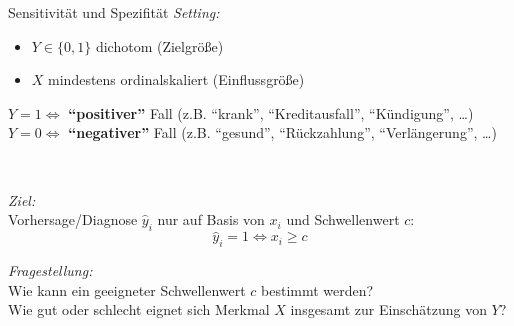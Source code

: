 \documentclass[
  10pt,
  ignorenonframetext,
]{beamer}
\providecommand{\tightlist}{%
  \setlength{\itemsep}{0pt}\setlength{\parskip}{0pt}}
\begin{document}
\begin{frame}{Sensitivität und Spezifität}
\label{sensitivituxe4t-und-spezifituxe4t}
\emph{Setting:}

\begin{itemize}
\tightlist
\item
  \(Y \in \{0, 1\}\) dichotom (Zielgröße)
\item
  \(X\) mindestens ordinalskaliert (Einflussgröße)
\end{itemize}

\(Y=1 \iff\) \textbf{``positiver''} Fall (z.B. ``krank'',
``Kreditausfall'', ``Kündigung'', \ldots)\\
\(Y=0 \iff\) \textbf{``negativer''} Fall (z.B. ``gesund'',
``Rückzahlung'', ``Verlängerung'', \ldots)\\
\strut ~

\emph{Ziel:}\\
Vorhersage/Diagnose \(\hat{y}_{i}\) nur auf Basis von \(x_i\) und
Schwellenwert \(c\): \[\hat{y}_{i} = 1\iff x_{i}\geq c\]

\emph{Fragestellung:}\\
Wie kann ein geeigneter Schwellenwert \(c\) bestimmt werden?\\
Wie gut oder schlecht eignet sich Merkmal \(X\) insgesamt zur
Einschätzung von \(Y\)?
\end{frame}
\end{document}
